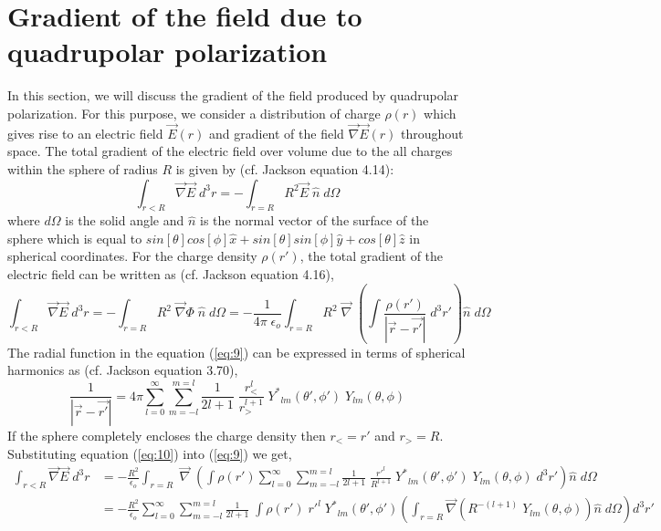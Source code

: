 \section{Gradient of the field due to quadrupolar polarization}
\label{singularQuad}
In this section, we will discuss the gradient of the field produced by
quadrupolar polarization. For this purpose, we consider a distribution
of charge ${\rho}(r)$ which gives rise to an electric field
$\vec{E}(r)$ and gradient of the field $\vec{\nabla} \vec{E}(r)$
throughout space. The total gradient of the electric field over volume
due to the all charges within the sphere of radius $R$ is given by
(cf. Jackson equation 4.14):
\begin{equation}
\int_{r<R} \vec{\nabla}\vec{E}\;d^3r = -\int_{r=R} R^2 \vec{E}\;\hat{n}\; d\Omega
\label{eq:8}
\end{equation}
where $d\Omega$ is the solid angle and $\hat{n}$ is the normal vector
of the surface of the sphere which is equal to
$sin[\theta]cos[\phi]\hat{x} + sin[\theta]sin[\phi]\hat{y} +
cos[\theta]\hat{z}$
in spherical coordinates.  For the charge density ${\rho}(r')$, the
total gradient of the electric field can be written as (cf. Jackson
equation 4.16),
\begin{equation}
\int_{r<R} \vec{\nabla}\vec{E}\; d^3r=-\int_{r=R} R^2\; \vec{\nabla}\Phi\; \hat{n}\; d\Omega  =-\frac{1}{4\pi\;\epsilon_o}\int_{r=R} R^2\; \vec{\nabla}\;\left(\int \frac{\rho(r')}{|\vec{r}-\vec{r'}|}\;d^3r'\right) \hat{n}\; d\Omega
\label{eq:9}
\end{equation}
The radial function in the equation (\ref{eq:9}) can be expressed in
terms of spherical harmonics as (cf. Jackson equation 3.70),
\begin{equation}
\frac{1}{|\vec{r} - \vec{r'}|} = 4\pi \sum_{l=0}^{\infty}\sum_{m=-l}^{m=l}\frac{1}{2l+1}\;\frac{{r^l_<}}{{r^{l+1}_>}}\;{Y^*}_{lm}(\theta', \phi')\;Y_{lm}(\theta, \phi)
\label{eq:10}
\end{equation}
If the sphere completely encloses the charge density then $ r_< = r'$ and $r_> = R$. Substituting equation (\ref{eq:10}) into (\ref{eq:9}) we get,
\begin{equation}
\begin{split}
\int_{r<R} \vec{\nabla}\vec{E}\;d^3r &=-\frac{R^2}{\epsilon_o}\int_{r=R} \; \vec{\nabla}\;\left(\int \rho(r')\sum_{l=0}^{\infty}\sum_{m=-l}^{m=l}\frac{1}{2l+1}\;\frac{{r'^l}}{{R^{l+1}}}\;{Y^*}_{lm}(\theta', \phi')\;Y_{lm}(\theta, \phi)\;d^3r'\right) \hat{n}\; d\Omega \\
 &= -\frac{R^2}{\epsilon_o}\sum_{l=0}^{\infty}\sum_{m=-l}^{m=l}\frac{1}{2l+1}\;\int \rho(r')\;{r'^l}\;{Y^*}_{lm}(\theta', \phi')\left(\int_{r=R}\vec{\nabla}\left({R^{-(l+1)}}\;Y_{lm}(\theta, \phi)\right)\hat{n}\; d\Omega \right)d^3r
'
\end{split}
\label{eq:11}
\end{equation} 
